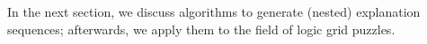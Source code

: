 In the next section, we discuss algorithms to generate (nested) explanation sequences; afterwards, we apply them to the field of logic grid puzzles.



